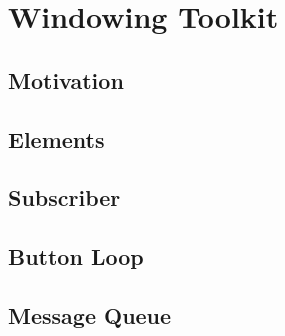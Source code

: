 
\chapter{Windowing Toolkit} %



\ifpdf
    \graphicspath{{5/figures/PNG/}{5/figures/PDF/}{5/figures/}}
\else
    \graphicspath{{5/figures/EPS/}{5/figures/}}
\fi


\section{Motivation}

\section{Elements}

\section{Subscriber}

\section{Button Loop}

\section{Message Queue}

%
%
%
%
%
%







